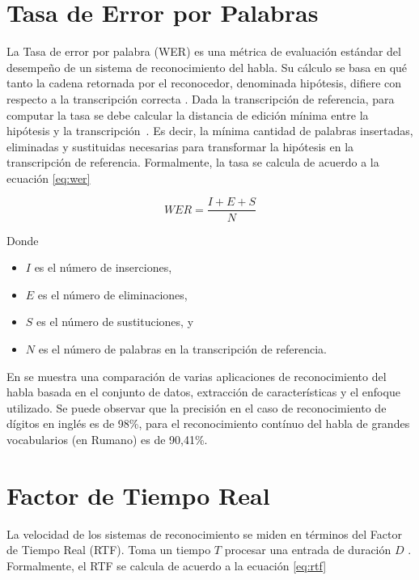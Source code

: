 \section{Tasa de Error por Palabras}
\label{sec:wer}

La Tasa de error por palabra (WER) es una m\'etrica de evaluaci\'on est\'andar del desempe\~no de un sistema de
reconocimiento del habla. Su c\'alculo se basa en qu\'e tanto la cadena retornada por el reconocedor,
denominada hip\'otesis, difiere con respecto a la transcripci\'on correcta \cite{Jurafsky}. 
Dada la transcripci\'on de referencia, para computar la tasa se debe calcular la distancia de edici\'on m\'inima
entre la hip\'otesis y la \mbox{transcripci\'on \cite{GaikwadAReview2010}}. Es decir, la m\'inima cantidad 
de palabras insertadas, eliminadas y sustituidas necesarias para transformar la hipótesis en la 
transcripción de referencia. Formalmente, la tasa se calcula de acuerdo a la ecuaci\'on \eqref{eq:wer}

\begin{equation}
\label{eq:wer}
    WER = \frac{I + E + S}{N} 
\end{equation}

Donde

\begin{itemize}
    \item $I$ es el n\'umero de inserciones,
    \item $E$ es el n\'umero de eliminaciones,
    \item $S$ es el n\'umero de sustituciones, y
    \item $N$ es el n\'umero de palabras en la transcripci\'on de referencia.
\end{itemize}

En \cite{VimalaReview2012} se muestra una comparaci\'on de varias aplicaciones de reconocimiento del habla basada
en el conjunto de datos, extracci\'on de caracter\'isticas y el enfoque utilizado. Se puede observar que la precisi\'on
en el caso de reconocimiento de d\'igitos en ingl\'es es de 98\%, para el reconocimiento cont\'inuo del habla
de grandes vocabularios (en Rumano) es de 90,41\%.

\section{Factor de Tiempo Real}
\label{sec:rtf}

La velocidad de los sistemas de reconocimiento se miden en t\'erminos del Factor de Tiempo Real (RTF). 
Toma un tiempo $T$ procesar una entrada de duraci\'on $D$ \cite{VimalaReview2012}. 
Formalmente, el RTF se calcula de acuerdo a la ecuaci\'on \eqref{eq:rtf}

